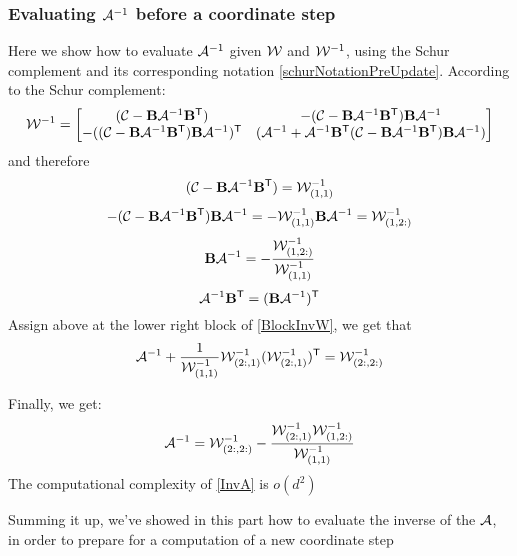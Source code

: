\subsubsection{Evaluating $\mathcal{A}^{-1}$ before a coordinate step}
Here we show how to evaluate $\mathcal{A}^{-1}$ given $\mathcal{W}$ and $\mathcal{W}^{-1}$, using the Schur complement and its corresponding notation \eqref{schurNotationPreUpdate}. According to the Schur complement: 
\begin{equation}
\mathcal{W}^{-1} =  \left[ \begin{matrix} (\mathcal{C}-\mathbf{B} \mathcal{A}^{-1} \mathbf{B}{}^\mathsf{T}) & -(\mathcal{C}-\mathbf{B} \mathcal{A}^{-1} \mathbf{B}{}^\mathsf{T}) \mathbf{B} \mathcal{A}^{-1} \\ -((\mathcal{C}-\mathbf{B} \mathcal{A}^{-1} \mathbf{B}{}^\mathsf{T}) \mathbf{B} \mathcal{A}^{-1} ){}^\mathsf{T} & (\mathcal{A}^{-1} + \mathcal{A}^{-1} \mathbf{B}{}^\mathsf{T} (\mathcal{C}-\mathbf{B} \mathcal{A}^{-1} \mathbf{B}{}^\mathsf{T}) \mathbf{B} \mathcal{A}^{-1} ) \end{matrix}  \right]
\label{BlockInvW}
\end{equation}
and therefore
\begin{equation}
(\mathcal{C}-\mathbf{B} \mathcal{A}^{-1} \mathbf{B}{}^\mathsf{T}) = \mathcal{W}^{-1}_{(1,1)}
\label{invWkk}
\end{equation}
\begin{equation}
-(\mathcal{C}-\mathbf{B} \mathcal{A}^{-1} \mathbf{B}{}^\mathsf{T}) \mathbf{B} \mathcal{A}^{-1} = -\mathcal{W}^{-1}_{(1,1)} \mathbf{B} \mathcal{A}^{-1} = \mathcal{W}^{-1}_{(1,2:)}
\end{equation}
\begin{equation}
\mathbf{B} \mathcal{A}^{-1} = -\frac{\mathcal{W}^{-1}_{(1,2:)}}{\mathcal{W}^{-1}_{(1,1)} }
\end{equation}
\begin{equation}
\mathcal{A}^{-1}\mathbf{B}{}^\mathsf{T} = (\mathbf{B} \mathcal{A}^{-1}){}^\mathsf{T}
\label{invA_Btrans}
\end{equation}
Assign above at the lower right block of \eqref{BlockInvW}, we get that
\begin{equation}
 \mathcal{A}^{-1} + \frac{1}{\mathcal{W}^{-1}_{(1,1)} } \mathcal{W}^{-1}_{(2:,1)} (\mathcal{W}^{-1}_{(2:,1)}){}^\mathsf{T} = \mathcal{W}^{-1}_{(2:,2:)}
\end{equation}

Finally, we get:
\begin{equation}
\mathcal{A}^{-1} = \mathcal{W}^{-1}_{(2:,2:)}- \frac{\mathcal{W}^{-1}_{(2:,1)} \mathcal{W}^{-1}_{(1,2:)}}{\mathcal{W}^{-1}_{(1,1)}}
\label{InvA}
\end{equation}
The computational complexity of \eqref{InvA} is $o(d^2)$

Summing it up, we've showed in this part how to evaluate the inverse of the $\mathcal{A}$, in order to prepare for a computation of a new coordinate step

